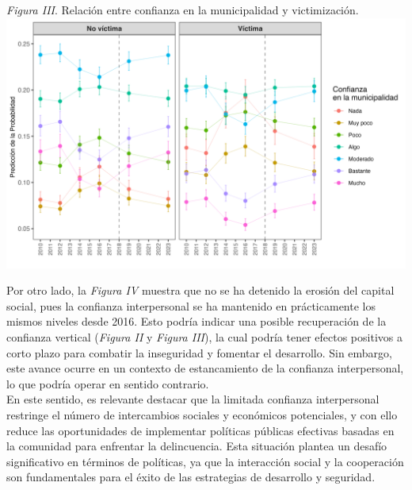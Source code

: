 \documentclass[letterpaper]{article}
\begin{document}
\vspace{-0.2cm}
\begin{center}
\emph{Figura III}. Relación entre confianza en la municipalidad y victimización.
\includegraphics[width = 14cm]{plot_mun.png}
    \label{tab:Figura4}
\end{center}

Por otro lado, la \emph{Figura IV} muestra que no se ha detenido la erosión del capital social, pues la confianza interpersonal se ha mantenido en prácticamente los mismos niveles desde 2016. Esto podría indicar una posible recuperación de la confianza vertical (\emph{Figura II} y \emph{Figura III}), la cual podría tener efectos positivos a corto plazo para combatir la inseguridad y fomentar el desarrollo. Sin embargo, este avance ocurre en un contexto de estancamiento de la confianza interpersonal, lo que podría operar en sentido contrario.\\[-1.5em]

En este sentido, es relevante destacar que la limitada confianza interpersonal restringe el número de intercambios sociales y económicos potenciales, y con ello reduce las oportunidades de implementar políticas públicas efectivas basadas en la comunidad para enfrentar la delincuencia. Esta situación plantea un desafío significativo en términos de políticas, ya que la interacción social y la cooperación son fundamentales para el éxito de las estrategias de desarrollo y seguridad.\\[-1.5em]
\end{document}
